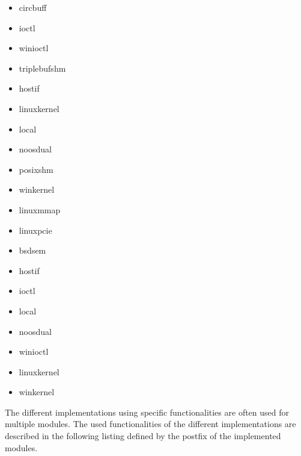 \begin{description}[leftmargin=0cm]
    \item[DLL] \mbox{}
    \begin{multicols}{3}
        \begin{itemize}
            \item circbuff
            \item ioctl
            \item winioctl
        \end{itemize}
    \end{multicols}
    
    \item[PDO] \mbox{}
    \begin{multicols}{3}
        \begin{itemize}
            \item triplebufshm
            \item hostif
            \item linuxkernel
            \item local
            \item noosdual
            \item posixshm
            \item winkernel
            \item linuxmmap
            \item linuxpcie
        \end{itemize}
    \end{multicols}
    
    \item[time sync] \mbox{}
    \begin{multicols}{3}
        \begin{itemize}
            \item bsdsem
            \item hostif
            \item ioctl
            \item local
            \item noosdual
            \item winioctl
            \item linuxkernel
            \item winkernel
        \end{itemize}
    \end{multicols}
\end{description}

The different implementations using specific functionalities are often used for multiple modules.
The used functionalities of the different implementations are described in the following listing defined by the postfix of the implemented modules.

